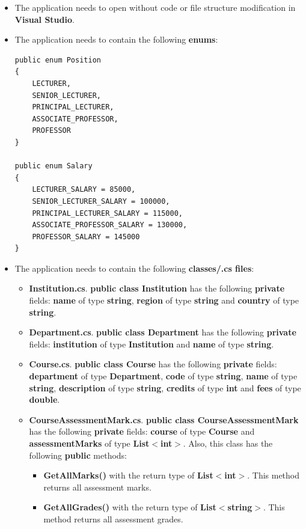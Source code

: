 \documentclass{article}
\begin{document}
\begin{itemize}
    \item The application needs to open without code or file structure modification in \textbf{Visual Studio}.
    \item The application needs to contain the following \textbf{enums}:
    \begin{verbatim}
public enum Position
{
    LECTURER,
    SENIOR_LECTURER,
    PRINCIPAL_LECTURER,
    ASSOCIATE_PROFESSOR,
    PROFESSOR
}
            
public enum Salary
{
    LECTURER_SALARY = 85000,
    SENIOR_LECTURER_SALARY = 100000,
    PRINCIPAL_LECTURER_SALARY = 115000,
    ASSOCIATE_PROFESSOR_SALARY = 130000,
    PROFESSOR_SALARY = 145000
}
    \end{verbatim}
    \item The application needs to contain the following \textbf{classes/.cs files}:
    \begin{itemize}
        \item \textbf{Institution.cs}. \textbf{public class Institution} has the following \textbf{private} fields: \textbf{name} of type \textbf{string}, \textbf{region} of type \textbf{string} and \textbf{country} of type \textbf{string}. 
        \item \textbf{Department.cs}. \textbf{public class Department} has the following \textbf{private} fields: \textbf{institution} of type \textbf{Institution} and \textbf{name} of type \textbf{string}.
        \item \textbf{Course.cs}. \textbf{public class Course} has the following \textbf{private} fields: \textbf{department} of type \textbf{Department}, \textbf{code} of type \textbf{string}, \textbf{name} of type \textbf{string}, \textbf{description} of type \textbf{string}, \textbf{credits} of type \textbf{int} and \textbf{fees} of type \textbf{double}.
        \item \textbf{CourseAssessmentMark.cs}. \textbf{public class CourseAssessmentMark} has the following \textbf{private} fields: \textbf{course} of type \textbf{Course} and \textbf{assessmentMarks} of type \textbf{List$<$int$>$}. Also, this class has the following \textbf{public} methods:
        \begin{itemize}
            \item \textbf{GetAllMarks()} with the return type of \textbf{List$<$int$>$}. This method returns all assessment marks.
            \item \textbf{GetAllGrades()} with the return type of \textbf{List$<$string$>$}. This method returns all assessment grades.

\end{itemize}
\end{itemize}
\end{itemize}
\end{document}
